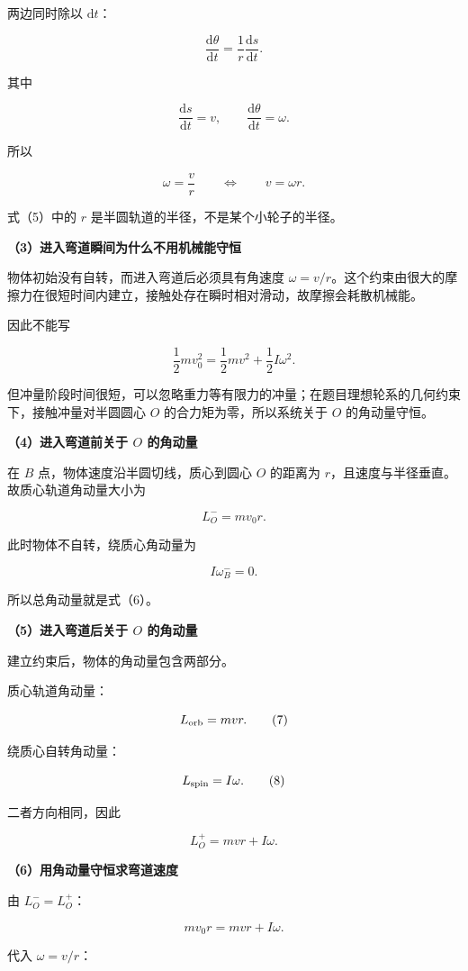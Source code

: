 \documentclass[12pt,a4paper,UTF8]{ctexart}
\begin{document}
两边同时除以 \(\mathrm dt\)：

\[
\frac{\mathrm d\theta}{\mathrm dt}
=\frac1r\frac{\mathrm ds}{\mathrm dt}.
\tag{4}
\]

其中

\[
\frac{\mathrm ds}{\mathrm dt}=v,
\qquad
\frac{\mathrm d\theta}{\mathrm dt}=\omega.
\]

所以

\[
\boxed{\omega=\frac vr}
\qquad\Longleftrightarrow\qquad
\boxed{v=\omega r}.
\tag{5}
\]

式（5）中的 \(r\) 是半圆轨道的半径，不是某个小轮子的半径。

\textbf{（3）进入弯道瞬间为什么不用机械能守恒}

物体初始没有自转，而进入弯道后必须具有角速度
\(\omega=v/r\)。这个约束由很大的摩擦力在很短时间内建立，接触处存在瞬时相对滑动，故摩擦会耗散机械能。

因此不能写

\[
\frac12mv_0^2
=\frac12mv^2+\frac12I\omega^2.
\]

但冲量阶段时间很短，可以忽略重力等有限力的冲量；在题目理想轮系的几何约束下，接触冲量对半圆圆心
\(O\) 的合力矩为零，所以系统关于 \(O\) 的角动量守恒。

\textbf{（4）进入弯道前关于 \(O\) 的角动量}

在 \(B\) 点，物体速度沿半圆切线，质心到圆心 \(O\) 的距离为
\(r\)，且速度与半径垂直。故质心轨道角动量大小为

\[
L_O^-=m v_0 r.
\tag{6}
\]

此时物体不自转，绕质心角动量为

\[
I\omega_B^-=0.
\]

所以总角动量就是式（6）。

\textbf{（5）进入弯道后关于 \(O\) 的角动量}

建立约束后，物体的角动量包含两部分。

质心轨道角动量：

\[
L_{\rm orb}=mvr.
\tag{7}
\]

绕质心自转角动量：

\[
L_{\rm spin}=I\omega.
\tag{8}
\]

二者方向相同，因此

\[
L_O^+=mvr+I\omega.
\tag{9}
\]

\textbf{（6）用角动量守恒求弯道速度}

由 \(L_O^-=L_O^+\)：

\[
mv_0r=mvr+I\omega.
\tag{10}
\]

代入 \(\omega=v/r\)：
\end{document}
